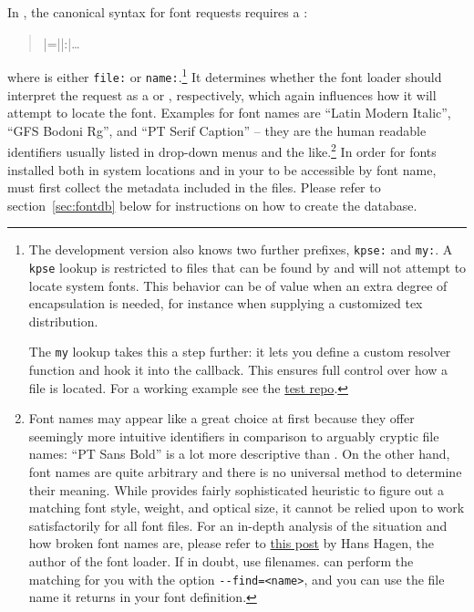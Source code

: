 In , the canonical syntax for font requests
requires a :
%
\begin{quote}
  |\font\fontname=||:|\dots
\end{quote}
%
where  is either \verb|file:| or \verb|name:|.\footnote{%
  The development version also knows two further prefixes,
  \verb|kpse:| and \verb|my:|.
  A \verb|kpse| lookup is restricted to files that can be found by
   and
  will not attempt to locate system fonts.
  This behavior can be of value when an extra degree of encapsulation is
  needed, for instance when supplying a customized tex distribution.

  The \verb|my| lookup takes this a step further: it lets you define
  a custom resolver function and hook it into the 
  callback.
  This ensures full control over how a file is located.
  For a working example see the
  \href{https://bitbucket.org/phg/lua-la-tex-tests/src/5f6a535d/pln-lookup-callback-1.tex}
       {test repo}.
}
%
It determines whether the font loader should interpret the request as
a  or
  , respectively,
which again influences how it will attempt to locate the font.
%
Examples for font names are
            “Latin Modern Italic”,
            “GFS Bodoni Rg”, and
            “PT Serif Caption”
-- they are the human readable identifiers
usually listed in drop-down menus and the like.\footnote{%
  Font names may appear like a great choice at first because they
  offer seemingly more intuitive identifiers in comparison to arguably
  cryptic file names:
  “PT Sans Bold” is a lot more descriptive than .
  On the other hand, font names are quite arbitrary and there is no
  universal method to determine their meaning.
  While  provides fairly sophisticated heuristic
  to figure out a matching font style, weight, and optical size, it
  cannot be relied upon to work satisfactorily for all font files.
  For an in-depth analysis of the situation and how broken font names
  are, please refer to
  \href{http://www.ntg.nl/pipermail/ntg-context/2013/073889.html}
       {this post}
  by Hans Hagen, the author of the font loader.
  If in doubt, use filenames.
   can perform the matching for you with the
  option \verb|--find=<name>|, and you can use the file name it returns
  in your font definition.
}
%
In order for fonts installed both in system locations and in your
 to be accessible by font name,  must
first collect the metadata included in the files.
%
Please refer to section~\ref{sec:fontdb} below for instructions on how to
create the database.

